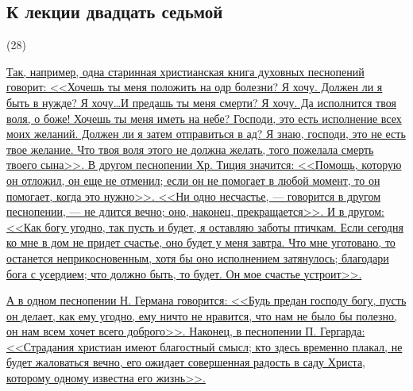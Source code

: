 \documentclass[12pt]{article}
\begin{document}
{}
\subsection*{К лекции двадцать седьмой}

\hypertarget{28}{(28)} \hyperlink{b28}{Так, например, одна старинная христианская книга духовных песнопений говорит: <<Хочешь ты меня положить на одр болезни? Я хочу. Должен ли я быть в нужде? Я хочу\dots И предашь ты меня смерти? Я хочу. Да исполнится твоя воля, о боже! Хочешь ты меня иметь на небе? Господи, это есть исполнение всех моих желаний. Должен ли я затем отправиться в ад? Я знаю, господи, это не есть твое желание. Что твоя воля этого не должна желать, того пожелала смерть твоего сына>>. В другом песнопении Хр. Тиция значится: <<Помощь, которую он отложил, он еще не отменил; если он не помогает в любой момент, то он помогает, когда это нужно>>. <<Ни одно несчастье, --- говорится в другом песнопении, --- не длится вечно; оно, наконец, прекращается>>. И в другом: <<Как богу угодно, так пусть и будет, я оставляю заботы птичкам. Если сегодня ко мне в дом не придет счастье, оно будет у меня завтра. Что мне уготовано, то останется неприкосновенным, хотя бы оно исполнением затянулось; благодари бога с усердием; что должно быть, то будет. Он мое счастье устроит>>.}

\hyperlink{b28}{А в одном песнопении Н. Германа говорится: <<Будь предан господу богу, пусть он делает, как ему угодно, ему ничто не нравится, что нам не было бы полезно, он нам всем хочет всего доброго>>. Наконец, в песнопении П. Гергарда: <<Страдания христиан имеют благостный смысл; кто здесь временно плакал, не будет жаловаться вечно, его ожидает совершенная радость в саду Христа, которому одному известна его жизнь>>.}
\end{document}
